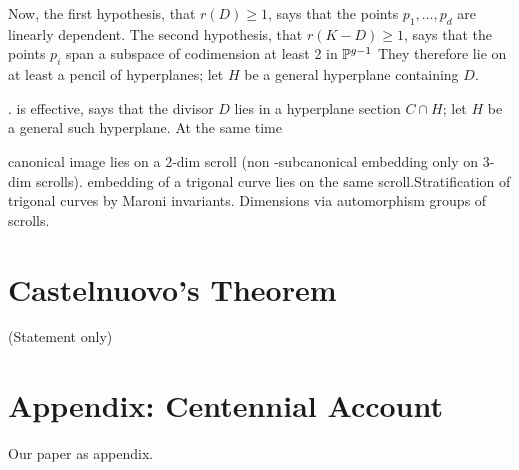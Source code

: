 Now, the first hypothesis, that $r(D) \geq 1$, says that the points $p_1,\dots,p_d$ are linearly dependent. The second hypothesis, that $r(K-D) \geq 1$, says that the points $p_i$ span a subspace of codimension at least 2 in $\PP^{g-1}$ They therefore lie on at least a pencil of hyperplanes; let $H$ be a general hyperplane containing $D$.




. is effective, says that the divisor $D$ lies in a hyperplane section $C \cap H$; let $H$ be a general such hyperplane. At the same time 

canonical image lies on a 2-dim scroll (non -subcanonical embedding only on 3-dim scrolls).  embedding of a trigonal curve lies on the same scroll.Stratification of trigonal curves by Maroni invariants. Dimensions via automorphism groups of scrolls.

\section{Castelnuovo's Theorem}
(Statement only) 

\section{Appendix: Centennial Account}
Our paper as appendix.
